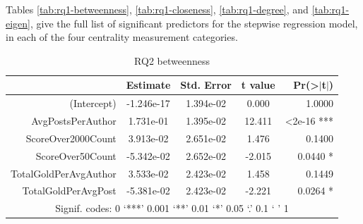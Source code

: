 \documentclass[bsc,frontabs,twoside,singlespacing,parskip,deptreport]{infthesis}
\begin{document}
Tables \ref{tab:rq1-betweenness}, \ref{tab:rq1-closeness}, \ref{tab:rq1-degree}, and \ref{tab:rq1-eigen}, give the full list of significant predictors for the stepwise regression model, in each of the four centrality measurement categories.

\newpage

\begin{table}[]
\centering
\caption{RQ2 betweenness}
\label{tab:rq2-betweenness}
\begin{tabular}{rcccr}
\hline
                      & Estimate  & Std. Error     & t value & Pr(\textgreater{}$\rvert$t$\rvert$) \\ \hline
(Intercept)           & -1.246e-17    & 1.394e-02 & 0.000   & 1.0000                              \\
AvgPostsPerAuthor     & 1.731e-01     & 1.395e-02 & 12.411  & \textless{}2e-16 ***                \\
ScoreOver2000Count    & 3.913e-02     & 2.651e-02 & 1.476   & 0.1400                              \\
ScoreOver50Count      & -5.342e-02    & 2.652e-02 & -2.015  & 0.0440 *                            \\
TotalGoldPerAvgAuthor & 3.533e-02     & 2.423e-02 & 1.458   & 0.1449                              \\
TotalGoldPerAvgPost   & -5.381e-02    & 2.423e-02 & -2.221  & 0.0264 *                            \\ \hline
\multicolumn{5}{c}{Signif. codes:  0 ‘***’ 0.001 ‘**’ 0.01 ‘*’ 0.05 ‘.’ 0.1 ‘ ’ 1}                \\ \hline
\end{tabular}
\end{table}
\end{document}
